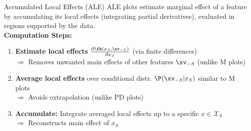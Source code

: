 \documentclass[10pt,compress,t,notes=noshow, xcolor=table]{beamer}
\begin{document}
\begin{framev}[align=top]{Accumulated Local Effects (ALE) }
ALE plots estimate marginal effect of a feature by accumulating its local effects (integrating partial derivatives), evaluated in regions supported by the data.\\
\spacer[0.25]
\textbf{Computation Steps:}
\begin{enumerate}[<+->]
\item \textbf{Estimate local effects} $\frac{\partial \fh(x_S, \xv_{-S})}{\partial x_S}$ (via finite differences) \label{ref1}\\ %
$\Rightarrow$ Removes unwanted main effects of other features $\xv_{-S}$ (unlike M plots)
\item \textbf{Average local effects} over conditional distr. $\P(\xv_{-S}|x_S)$ similar to M plots\\ %
$\Rightarrow$ Avoids extrapolation (unlike PD plots)\label{ref2}
\item \textbf{Accumulate:} Integrate averaged local effects up to a specific $x \in \mathcal{X}_S$\\ %
$\Rightarrow$ Reconstructs main effect of $x_S$ \label{ref3}\\
\end{enumerate}
\end{framev}
\end{document}
